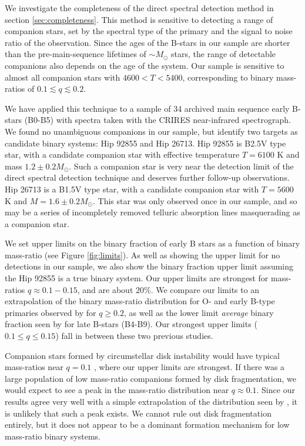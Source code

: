 \documentclass[11pt]{report}     %
\begin{document}
We investigate the completeness of the direct spectral detection method in section \ref{sec:completeness}. This method is sensitive to detecting a range of companion stars, set by the spectral type of the primary and the signal to noise ratio of the observation. Since the ages of the B-stars in our sample are shorter than the pre-main-sequence lifetimes of $\sim M_{\odot}$ stars, the range of detectable companions also depends on the age of the system. Our sample is sensitive to almost all companion stars with $4600 < T < 5400$, corresponding to binary mass-ratios of $0.1 \lesssim q \lesssim 0.2$.

 We have applied this technique to a sample of 34 archived main sequence 
early B-stars (B0-B5) with spectra taken with the CRIRES near-infrared
spectrograph. We found no unambiguous companions in our sample, but identify two targets as candidate binary systems: Hip 92855 and Hip 26713. Hip 92855 is B2.5V type star, with a candidate companion star with effective temperature $T = 6100$ K and mass $1.2 \pm 0.2 M_{\odot}$. Such a companion star is very near the detection limit of the direct spectral detection technique and deserves further follow-up observations. Hip 26713 is a B1.5V type star, with a candidate companion star with $T = 5600$ K and $M = 1.6 \pm 0.2 M_{\odot}$. This star was only observed once in our sample, and so may be a series of incompletely removed telluric absorption lines masquerading as a companion star.

We set upper limits on the binary fraction of early B stars as a function of binary mass-ratio (see Figure \ref{fig:limits}). As well as showing the upper limit for no detections in our sample, we also show the binary fraction upper limit assuming the Hip 92855 is a true binary system.  Our upper limits are strongest for mass-ratios $q \approx 0.1 - 0.15$, and are
about $20\%$. We compare our limits to an extrapolation of the binary mass-ratio distribution for O- and early B-type primaries observed by \cite{Sana2011} for $q \geq 0.2$, as well as the lower limit \emph{average} binary fraction seen by \cite{Evans2011} for late B-stars (B4-B9). Our strongest upper limits ($0.1 \leq q \leq 0.15$) fall in between these two previous studies.

Companion stars formed by circumstellar disk instability would have typical mass-ratios near $q = 0.1$ \citep{Kratter2006, Stamatellos2011}, where our upper limits are strongest. If there was a large population of low mass-ratio companions formed by disk fragmentation, we would expect to see a peak in the mass-ratio distribution near $q \approx 0.1$. Since our results agree very well with a simple extrapolation of the distribution seen by \cite{Sana2011}, it is unlikely that such a peak exists. We cannot rule out disk fragmentation entirely, but it does not appear to be a dominant formation mechanism for low mass-ratio binary systems.
\end{document}
